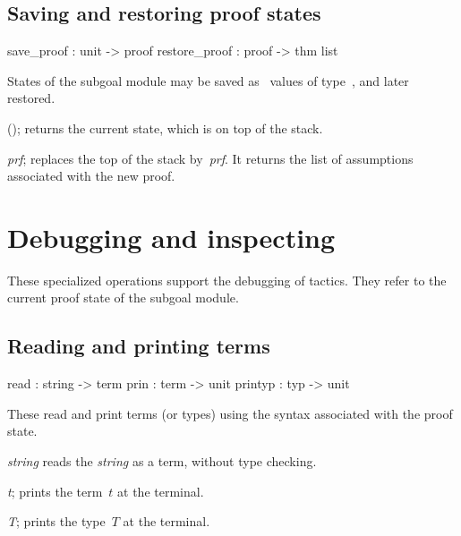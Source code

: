 \subsection{Saving and restoring proof states}
\begin{ttbox} 
save_proof    : unit -> proof
restore_proof : proof -> thm list
\end{ttbox}
States of the subgoal module may be saved as \ML\ values of
type~, and later restored.

\begin{ttdescription}
\item[\ttindexbold{save_proof}();]  
returns the current state, which is on top of the stack.

\item[\ttindexbold{restore_proof} {\it prf};]
  replaces the top of the stack by~{\it prf}.  It returns the list of
  assumptions associated with the new proof.
\end{ttdescription}


\section{Debugging and inspecting}
These specialized operations support the debugging of tactics.  They refer
to the current proof state of the subgoal module.

\subsection{Reading and printing terms}
\begin{ttbox} 
read    : string -> term
prin    : term -> unit
printyp : typ -> unit
\end{ttbox}
These read and print terms (or types) using the syntax associated with the
proof state.

\begin{ttdescription}
\item[\ttindexbold{read} {\it string}]  
reads the {\it string} as a term, without type checking.

\item[\ttindexbold{prin} {\it t};]  
prints the term~$t$ at the terminal.

\item[\ttindexbold{printyp} {\it T};]  
prints the type~$T$ at the terminal.
\end{ttdescription}


